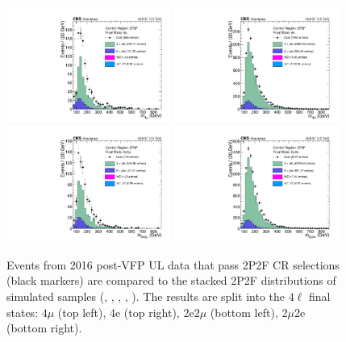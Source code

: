 \begin{figure}[!htbp]
	\begin{center}
		\includegraphics[width=0.48\textwidth]{figures/higgsmassmeas/redbkg/cr/UL2016postVFP_CR_2P2F_4mu.pdf}
		\includegraphics[width=0.48\textwidth]{figures/higgsmassmeas/redbkg/cr/UL2016postVFP_CR_2P2F_4e.pdf}
		\includegraphics[width=0.48\textwidth]{figures/higgsmassmeas/redbkg/cr/UL2016postVFP_CR_2P2F_2e2mu.pdf}
		\includegraphics[width=0.48\textwidth]{figures/higgsmassmeas/redbkg/cr/UL2016postVFP_CR_2P2F_2mu2e.pdf}
		\caption{
			Events from 2016 post-VFP UL data that pass 2P2F CR selections (black markers) 
			are compared to the stacked 2P2F distributions of simulated samples
			(\Zplusjets, \ttbarplusjets, \WZ, \ZZ, \Zgammastar).
			The results are split into the $4\ell$ final states:
            $4\mu$ (top left), 4e (top right), 2e2$\mu$ (bottom left), 2$\mu$2e (bottom right).
        }
		\label{cr_plots_2p2f_2016postvfp}
	\end{center}
\end{figure}
